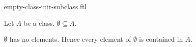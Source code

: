 \documentclass{article}
\begin{document}
\begin{smodule}{empty-class-init-subclass.ftl}

  \begin{fproposition*}[label=6931785090859008]
    Let $A$ be a class.
    $\emptyset \subseteq A$.
  \end{fproposition*}
  \begin{fproof*}
    $\emptyset$ has no elements.
    Hence every element of $\emptyset$ is contained in $A$.
  \end{fproof*}
\end{smodule}
\end{document}
